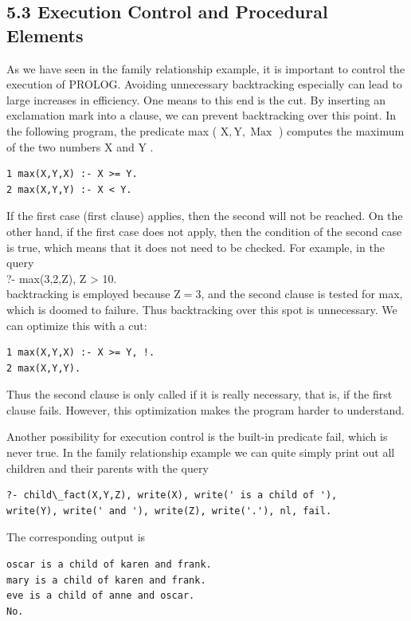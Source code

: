 \documentclass[10pt]{article}
\begin{document}
\subsection*{5.3 Execution Control and Procedural Elements}
As we have seen in the family relationship example, it is important to control the execution of PROLOG. Avoiding unnecessary backtracking especially can lead to large increases in efficiency. One means to this end is the cut. By inserting an exclamation mark into a clause, we can prevent backtracking over this point. In the following program, the predicate max ( $\mathrm{X}, \mathrm{Y}, \operatorname{Max}$ ) computes the maximum of the two numbers X and Y .

\begin{verbatim}
1 max(X,Y,X) :- X >= Y.
2 max(X,Y,Y) :- X < Y.
\end{verbatim}

If the first case (first clause) applies, then the second will not be reached. On the other hand, if the first case does not apply, then the condition of the second case is true, which means that it does not need to be checked. For example, in the query\\
?- max(3,2,Z), Z > 10.\\
backtracking is employed because $\mathrm{Z}=3$, and the second clause is tested for max, which is doomed to failure. Thus backtracking over this spot is unnecessary. We can optimize this with a cut:


\begin{verbatim}
1 max(X,Y,X) :- X >= Y, !.
2 max(X,Y,Y).
\end{verbatim}

Thus the second clause is only called if it is really necessary, that is, if the first clause fails. However, this optimization makes the program harder to understand.

Another possibility for execution control is the built-in predicate fail, which is never true. In the family relationship example we can quite simply print out all children and their parents with the query

\begin{verbatim}
?- child\_fact(X,Y,Z), write(X), write(' is a child of '),
write(Y), write(' and '), write(Z), write('.'), nl, fail.
\end{verbatim}

The corresponding output is

\begin{verbatim}
oscar is a child of karen and frank.
mary is a child of karen and frank.
eve is a child of anne and oscar.
No.
\end{verbatim}
\end{document}
